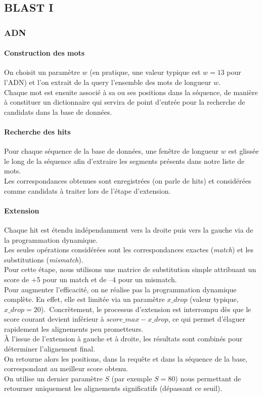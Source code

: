 \documentclass[conference]{IEEEtran}
\begin{document}
\subsection{BLAST I}

\subsubsection{ADN}

\paragraph{Construction des mots}
On choisit un paramètre $w$ (en pratique, une valeur typique est $w = 13$ pour l’ADN) et l’on extrait de la query l’ensemble des mots de longueur $w$.\\
Chaque mot est ensuite associé à sa ou ses positions dans la séquence, de manière à constituer un dictionnaire qui servira de point d’entrée pour la recherche de candidats dans la base de données.

\paragraph{Recherche des hits}
Pour chaque séquence de la base de données, une fenêtre de longueur $w$ est glissée le long de la séquence afin d’extraire les segments présents dans notre liste de mots.\\
Les correspondances obtenues sont enregistrées (on parle de hits) et considérées comme candidats à traiter lors de l’étape d’extension.

\paragraph{Extension}
Chaque hit est étendu indépendamment vers la droite puis vers la gauche via de la programmation dynamique.\\
Les seules opérations considérées sont les correspondances exactes (\emph{match}) et les substitutions (\emph{mismatch}).\\
Pour cette étape, nous utilisons une matrice de substitution simple attribuant un score de +5 pour un match et de –4 pour un mismatch.\\
Pour augmenter l'efficacité, on ne réalise pas la programmation dynamique complète. En effet, elle est limitée via un paramètre $x\_drop$ (valeur typique, $x\_drop = 20$).\
Concrètement, le processus d’extension est interrompu dès que le score courant devient inférieur à $score\_max - x\_drop$, ce qui permet d’élaguer rapidement les alignements peu prometteurs.\\
À l’issue de l’extension à gauche et à droite, les résultats sont combinés pour déterminer l’alignement final.\\
On retourne alors les positions, dans la requête et dans la séquence de la base, correspondant au meilleur score obtenu.\\
On utilise un dernier paramètre $S$ (par exemple $S = 80$) nous permettant de retourner uniquement les alignements significatifs (dépassant ce seuil).
\end{document}
